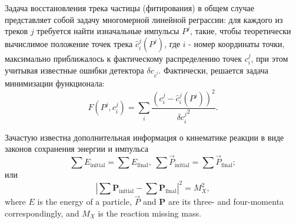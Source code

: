 %
%

Задача восстановления трека частицы (фитирования) в общем случае представляет собой задачу многомерной линейной реграссии: для каждого из треков $j$ требуется найти изначальные импульсы $P^j$, такие, чтобы теоретически вычислимое положение точек трека $\hat{c}_i^j(P^j)$, где $i$ - номер координаты точки, максимально приближалось к фактическому распределению точек $c_i^j$, при этом учитывая известные ошибки детектора $\delta c_{i^j}$. Фактически, решается задача минимизации функционала:
\begin{equation}
\label{track_fit}
F(P^j, c_i^j) = \sum_i \frac{(c_i^j - \hat{c}_i^j(P^j))^2}{{\delta c_i^j}^2}.
\end{equation}

Зачастую известна дополнительная информация о кинематике реакции в виде законов сохранения энергии и импульса
\begin{equation}
\label{cons_full}
\sum E_\mathrm{initial} = \sum E_\mathrm{final},~\sum\vec{P}_\mathrm{initial} = \sum\vec{P}_\mathrm{final};
\end{equation}
или
\begin{equation}
\label{cons_miss}
\displaystyle\left|\sum\boldsymbol{P}_\mathrm{initial} - \sum\boldsymbol{P}_\mathrm{final}\right|^2 = M_X^2,
\end{equation}
where $E$ is the energy of a particle, $\vec{P}$ and $\boldsymbol{P}$ are its three- and four-momenta correspondingly, and $M_X$ is the reaction missing mass.

